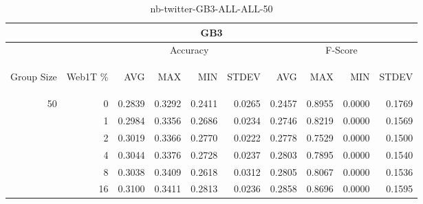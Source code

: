\begin{center}
\begin{table}[htbp]
\begin{tabular}{ | r | r | r | r | r | r | r | r | r | r |}
\hline
\multicolumn{10}{|c|}{GB3}\\
\hline
 & & \multicolumn{4}{|c|}{Accuracy} & \multicolumn{4}{|c|}{F-Score}\\ \cline{3-10}
\begin{sideways}Group Size\end{sideways} & \begin{sideways}Web1T \%\end{sideways} & \begin{sideways}AVG\end{sideways} & \begin{sideways}MAX\end{sideways} & \begin{sideways}MIN\end{sideways} & \begin{sideways}STDEV\end{sideways} & \begin{sideways}AVG\end{sideways} & \begin{sideways}MAX\end{sideways} & \begin{sideways}MIN\end{sideways} & \begin{sideways}STDEV\end{sideways}\\
\hline
\multirow{5}{*}{50}
 & 0 & 0.2839 & 0.3292 & 0.2411 & 0.0265 & 0.2457 & 0.8955 & 0.0000 & 0.1769\\ \cline{2-10}
 & 1 & 0.2984 & 0.3356 & 0.2686 & 0.0234 & 0.2746 & 0.8219 & 0.0000 & 0.1569\\ \cline{2-10}
 & 2 & 0.3019 & 0.3366 & 0.2770 & 0.0222 & 0.2778 & 0.7529 & 0.0000 & 0.1500\\ \cline{2-10}
 & 4 & 0.3044 & 0.3376 & 0.2728 & 0.0237 & 0.2803 & 0.7895 & 0.0000 & 0.1540\\ \cline{2-10}
 & 8 & 0.3038 & 0.3409 & 0.2618 & 0.0312 & 0.2805 & 0.8067 & 0.0000 & 0.1536\\ \cline{2-10}
 & 16 & 0.3100 & 0.3411 & 0.2813 & 0.0236 & 0.2858 & 0.8696 & 0.0000 & 0.1595\\ \cline{2-10}
\hline
\end{tabular}
\caption{nb-twitter-GB3-ALL-ALL-50}
\label{table:nb-twitter-GB3-ALL-ALL-50}
\end{table}
\end{center}

